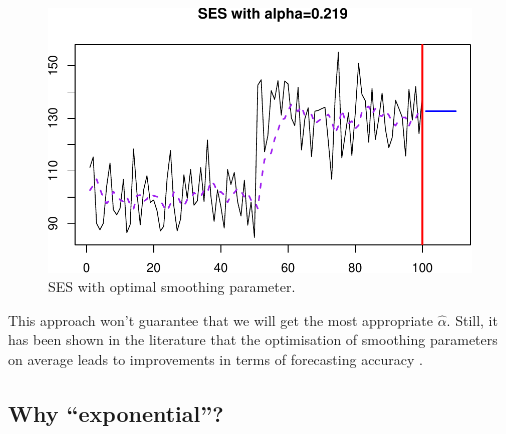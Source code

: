 \documentclass[
]{book}
\newenvironment{Shaded}{\begin{snugshade}}{\end{snugshade}}
\newcommand{\AttributeTok}[1]{\textcolor[rgb]{0.77,0.63,0.00}{#1}}
\newcommand{\DecValTok}[1]{\textcolor[rgb]{0.00,0.00,0.81}{#1}}
\newcommand{\FunctionTok}[1]{\textcolor[rgb]{0.00,0.00,0.00}{#1}}
\newcommand{\NormalTok}[1]{#1}
\newcommand{\OtherTok}[1]{\textcolor[rgb]{0.56,0.35,0.01}{#1}}
\newcommand{\SpecialCharTok}[1]{\textcolor[rgb]{0.00,0.00,0.00}{#1}}
\newcommand{\StringTok}[1]{\textcolor[rgb]{0.31,0.60,0.02}{#1}}
\theoremstyle{definition}
\theoremstyle{definition}
\theoremstyle{definition}
\theoremstyle{definition}
\theoremstyle{remark}
\begin{document}
\begin{Shaded}
\end{Shaded}

\begin{figure}
\centering
\includegraphics{Svetunkov--2022----ADAM_files/figure-latex/SESExample3-1.pdf}
\caption{\label{fig:SESExample3}SES with optimal smoothing parameter.}
\end{figure}

This approach won't guarantee that we will get the most appropriate \(\hat{\alpha}\). Still, it has been shown in the literature that the optimisation of smoothing parameters on average leads to improvements in terms of forecasting accuracy \citep[see, for example,][]{Fildes1992}.

\hypertarget{whyExponential}{%
\subsection{Why ``exponential''?}\label{whyExponential}}
\end{document}
